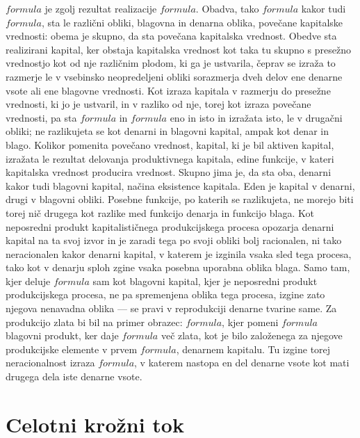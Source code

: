 \documentclass[kapital_02.tex]{subfiles}
\begin{document}
\( formula \) je zgolj rezultat realizacije \( formula \). Obadva, tako \( formula \) kakor tudi \( formula \), sta le različni obliki, blagovna in denarna oblika, povečane kapitalske vrednosti: obema je skupno, da sta povečana kapitalska vrednost. Obedve sta realizirani kapital, ker obstaja kapitalska vrednost kot taka tu skupno s presežno vrednostjo kot od nje različnim plodom, ki ga je ustvarila, čeprav se izraža to razmerje le v vsebinsko neopredeljeni obliki sorazmerja dveh delov ene denarne vsote ali ene blagovne vrednosti. Kot izraza kapitala v razmerju do presežne vrednosti, ki jo je ustvaril, in v razliko od nje, torej kot izraza povečane vrednosti, pa sta \( formula \) in \( formula \) eno in isto in izražata isto, le v drugačni obliki; ne razlikujeta se kot denarni in blagovni kapital, ampak kot denar in blago. Kolikor pomenita povečano vrednost, kapital, ki je bil aktiven kapital, izražata le rezultat delovanja produktivnega kapitala, edine funkcije, v kateri kapitalska vrednost producira vrednost. Skupno jima je, da sta oba, denarni kakor tudi blagovni kapital, načina eksistence kapitala. Eden je kapital v denarni, drugi v blagovni obliki. Posebne funkcije, po katerih se razlikujeta, ne morejo biti torej nič drugega kot razlike med funkcijo denarja in funkcijo blaga. Kot neposredni produkt kapitalističnega produkcijskega procesa opozarja denarni kapital na ta svoj izvor in je zaradi tega po svoji obliki bolj racionalen, ni tako neracionalen kakor denarni kapital, v katerem je izginila vsaka sled tega procesa, tako kot v denarju sploh zgine vsaka posebna uporabna oblika blaga. Samo tam, kjer deluje \( formula \) sam kot blagovni kapital, kjer je neposredni produkt produkcijskega procesa, ne pa spremenjena oblika tega procesa, izgine zato njegova nenavadna oblika --- se pravi v reprodukciji denarne tvarine same. Za produkcijo zlata bi bil na primer obrazec: \( formula \), kjer pomeni \( formula \) blagovni produkt, ker daje \( formula \) več zlata, kot je bilo založenega za njegove produkcijske elemente v prvem \( formula \), denarnem kapitalu. Tu izgine torej neracionalnost izraza \( formula \), v katerem nastopa en del denarne vsote kot mati drugega dela iste denarne vsote.

\section{Celotni krožni tok}
\end{document}
